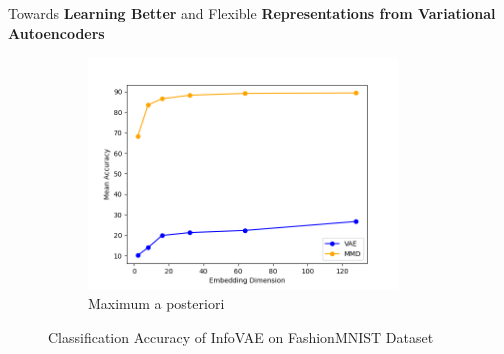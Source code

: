 \documentclass[hyperref={colorlinks,citecolor=blue,linkcolor=blue,urlcolor=blue}]{beamer}
\begin{document}
\begin{frame}{ Towards \textbf{Learning Better} and Flexible \textbf{Representations from Variational Autoencoders} \vspace{0.3em}}
\begin{figure}
\begin{subfigure}[b]{0.4\textwidth}
        \includegraphics[width=0.9\textwidth]{./Images/FashionMNIST_MMD_MAP.png}
        \caption{Maximum a posteriori}
    \end{subfigure}
    \caption{Classification Accuracy of InfoVAE on FashionMNIST Dataset}
  \end{figure}
\end{frame}
\end{document}

